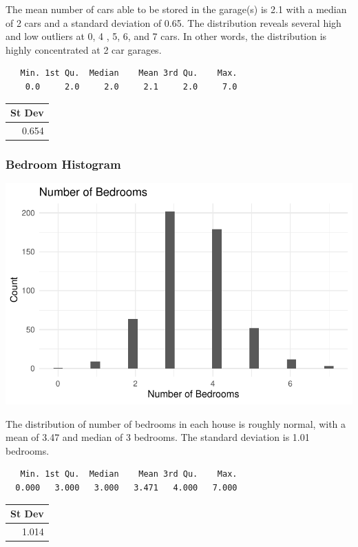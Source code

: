 \documentclass[
  letterpaper,
  DIV=11,
  numbers=noendperiod]{scrartcl}
\begin{document}
The mean number of cars able to be stored in the garage(s) is 2.1 with a
median of 2 cars and a standard deviation of 0.65. The distribution
reveals several high and low outliers at 0, 4 , 5, 6, and 7 cars. In
other words, the distribution is highly concentrated at 2 car garages.

\begin{verbatim}
   Min. 1st Qu.  Median    Mean 3rd Qu.    Max. 
    0.0     2.0     2.0     2.1     2.0     7.0 
\end{verbatim}

\begin{tabular}{r}
\hline
St Dev\\
\hline
0.654\\
\hline
\end{tabular}

\hypertarget{bedroom-histogram}{%
\subsubsection{Bedroom Histogram}\label{bedroom-histogram}}

\includegraphics{final_project_files/figure-pdf/unnamed-chunk-5-1.pdf}

The distribution of number of bedrooms in each house is roughly normal,
with a mean of 3.47 and median of 3 bedrooms. The standard deviation is
1.01 bedrooms.

\begin{verbatim}
   Min. 1st Qu.  Median    Mean 3rd Qu.    Max. 
  0.000   3.000   3.000   3.471   4.000   7.000 
\end{verbatim}

\begin{tabular}{r}
\hline
St Dev\\
\hline
1.014\\
\hline
\end{tabular}
\end{document}
